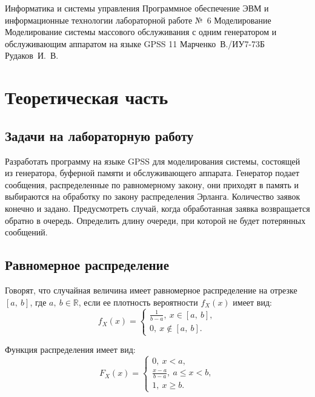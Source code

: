 \documentclass{bmstu}
\begin{document}
\makereporttitle
    {Информатика и системы управления}
    {Программное обеспечение ЭВМ и информационные технологии}
    {лабораторной работе №~6} %
    {Моделирование} %
    {Моделирование системы массового обслуживания с одним генератором и обслуживающим аппаратом на языке GPSS} %
    {11} %
    {Марченко~В./ИУ7-73Б} %
    {Рудаков~И.~В.} %

{\centering \maketableofcontents}

\chapter{Теоретическая часть}

\section{Задачи на лабораторную работу}

Разработать программу на языке GPSS для моделирования системы, состоящей из генератора, буферной памяти и обслуживающего аппарата. 
Генератор подает сообщения, распределенные по равномерному закону, они
приходят в память и выбираются на обработку по закону распределения Эрланга. 
Количество заявок конечно и задано. 
Предусмотреть случай, когда обработанная заявка возвращается обратно в очередь. 
Определить длину очереди, при которой не будет потерянных сообщений.

\section{Равномерное распределение}

Говорят, что случайная величина имеет равномерное распределение на отрезке $[a,~b]$, где $a,~b \in \mathbb{R}$, если ее плотность вероятности $f_{X}(x)$ имеет вид:
\begin{equation}
f_{X}(x) = \begin{cases}
	\frac{1}{b - a},~x \in [a,~b], \\
	0,~x \notin [a,~b].
	\end{cases}
\end{equation}

Функция распределения имеет вид:
\begin{equation}
F_{X}(x) = \begin{cases}
	0,~x < a, \\
	\frac{x - a}{b - a},~a \leq x < b, \\
	1,~x \geq b.
	\end{cases}
\end{equation}
\end{document}

